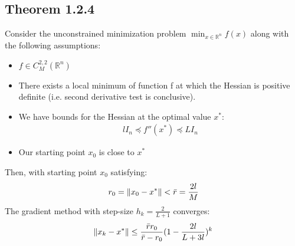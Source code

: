 \documentclass[12pt,a4paper]{article}
\begin{document}
	\subsection*{Theorem 1.2.4}\label{thm124}
	Consider the unconstrained minimization problem $\min_{x \in \mathbb{R}^n}f(x)$ along with the following assumptions:
	\begin{itemize}
		\item $f \in C_M^{2,2}(\mathbb{R}^n)$
		\item There exists a local minimum of function f at which the Hessian is positive definite (i.e. second derivative test is conclusive).
		\item We have bounds for the Hessian at the optimal value $x^*$:
		\begin{align*}
			l I_n \preceq f''(x^*) \preceq LI_n
		\end{align*} 
		\item Our starting point $x_0$ is close to $x^*$
	\end{itemize}
	Then, with starting point $x_0$ satisfying:
	\begin{align*}
		r_0 = \norm{x_0 - x^*} < \bar{r}=\frac{2l}{M}
	\end{align*}
	The gradient method with step-size $h_k = \frac{2}{L+1}$ converges:
	\begin{align*}
		\norm{x_k - x^*} \leq \frac{\bar{r}r_0}{\bar{r} - r_0}(1 - \frac{2l}{L + 3l})^k
	\end{align*}
	
\end{document}
